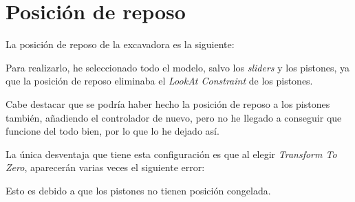 \section{Posición de reposo}

La posición de reposo de la excavadora es la siguiente:


Para realizarlo, he seleccionado todo el modelo, salvo los \textit{sliders} y los pistones, ya que la posición de reposo eliminaba el \textit{LookAt Constraint} de los pistones.

\bigskip

Cabe destacar que se podría haber hecho la posición de reposo a los pistones también, añadiendo el controlador de nuevo, pero no he llegado a conseguir que funcione del todo bien, por lo que lo he dejado así.

\bigskip

La única desventaja que tiene esta configuración es que al elegir \textit{Transform To Zero}, aparecerán varias veces el siguiente error:


Esto es debido a que los pistones no tienen posición congelada.